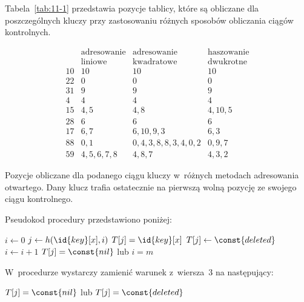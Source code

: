 \exercise %
\exercise %


\exercise %

\noindent Tabela~\ref{tab:11-1} przedstawia pozycje tablicy, które są obliczane dla poszczególnych kluczy przy zastosowaniu różnych sposobów obliczania ciągów kontrolnych.

\begin{table}[ht]
	\begin{center}
		\[
			\begin{array}{c|c|c|c}
				& \text{adresowanie} & \text{adresowanie} & \text{haszowanie} \\
				& \text{liniowe} & \text{kwadratowe} & \text{dwukrotne} \\
				\hline
				10 & 10 & 10 & 10 \\
				\hline
				22 & 0 & 0 & 0 \\
				\hline
				31 & 9 & 9 & 9 \\
				\hline
				4 & 4 & 4 & 4 \\
				\hline
				15 & 4,5 & 4,8 & 4,10,5 \\
				\hline
				28 & 6 & 6 & 6 \\
				\hline
				17 & 6,7 & 6,10,9,3 & 6,3 \\
				\hline
				88 & 0,1 & 0,4,3,8,8,3,4,0,2 & 0,9,7 \\
				\hline
				59 & 4,5,6,7,8 & 4,8,7 & 4,3,2
			\end{array}
		\]
	\end{center}
	\caption{Pozycje obliczane dla podanego ciągu kluczy w~różnych metodach adresowania otwartego. Dany klucz trafia ostatecznie na pierwszą wolną pozycję ze swojego ciągu kontrolnego.} \label{tab:11-1}
\end{table}

\exercise %
Pseudokod procedury  przedstawiono poniżej:
\begin{codebox}
\li	$i\gets0$
\li	\Repeat
		$j\gets h(\id{key}[x],i)$
\li		\If $T[j]=\id{key}[x]$
\li			\Then
				$T[j]\gets\const{deleted}$
\li				\Return
			\End
\li		$i\gets i+1$
\li	\Until $T[j]=\const{nil}$ lub $i=m$
\end{codebox}
W~procedurze  wystarczy zamienić warunek z~wiersza~3 na następujący:
\begin{codebox}
\setcounter{codelinenumber}{2}
\li	\If $T[j]=\const{nil}$ lub $T[j]=\const{deleted}$
\end{codebox}

